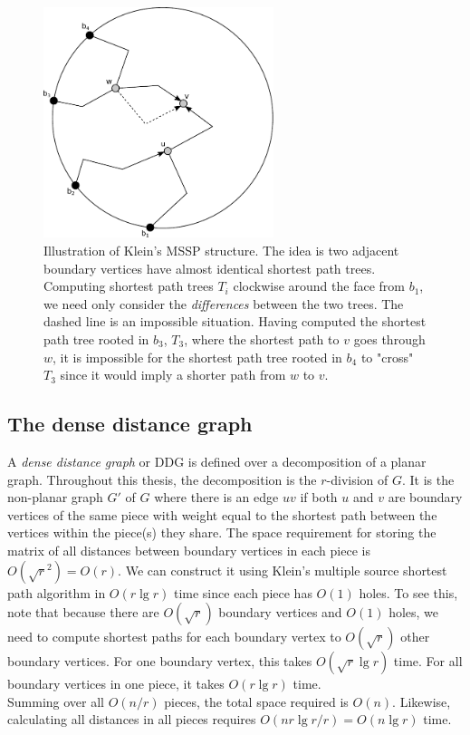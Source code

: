 \begin{figure}[h!]
  \centering
  \includegraphics[width=0.6\textwidth]{figs/klein.pdf}
  \caption{Illustration of Klein's MSSP structure. The idea is two adjacent boundary
    vertices have almost identical shortest path trees. Computing shortest path trees
    $T_i$ clockwise
    around the face from $b_1$, we need only consider the \textit{differences} between
  the two trees. The dashed line is an impossible situation. Having computed the shortest
path tree rooted in $b_3$, $T_3$, where the shortest path to $v$ goes through $w$, it is
impossible for the shortest path tree rooted in $b_4$ to "cross" $T_3$ since it would
imply a shorter path from $w$ to $v$.}
    \label{klein}
\end{figure}

\subsection{The dense distance graph}
A \textit{dense distance graph} or DDG is defined over a decomposition of a planar
graph. Throughout this thesis, the decomposition is the $r$-division of $G$. It is the non-planar graph $G'$ of $G$ where there is an edge $uv$ if both $u$ and
$v$ are boundary vertices of the same piece with weight equal to the shortest path between the vertices within
the piece(s) they share. The space requirement for storing the matrix of all distances between boundary
vertices in each piece is $O(\sqrt{r}^2)=O(r)$. We can construct it using Klein's multiple source shortest
path algorithm in $O(r\lg r)$ time since each piece has $O(1)$ holes. To see this, note
that because there are $O(\sqrt{r})$ boundary vertices and $O(1)$ holes, we need to
compute shortest paths for each boundary vertex to $O(\sqrt{r})$ other boundary vertices.
For one boundary vertex, this takes $O(\sqrt{r}\lg r)$ time. For all boundary vertices in
one piece, it takes $O(r\lg r)$ time. \\
Summing over all $O(n/r)$ pieces, the total space required is $O(n)$. Likewise, calculating all
distances in all pieces requires $O(nr\lg r/r)=O(n\lg r)$ time.

